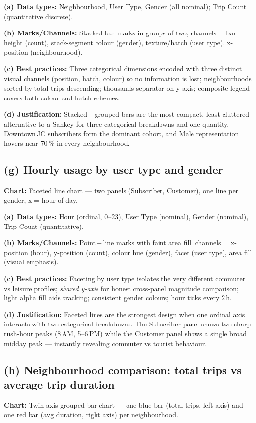 \documentclass[11pt, a4paper]{article}
\begin{document}
\textbf{(a) Data types:} Neighbourhood, User Type, Gender (all nominal); Trip Count (quantitative discrete).

\textbf{(b) Marks/Channels:} Stacked bar marks in groups of two; channels = bar height (count), stack-segment colour (gender), texture/hatch (user type), x-position (neighbourhood).

\textbf{(c) Best practices:} Three categorical dimensions encoded with three distinct visual channels (position, hatch, colour) so no information is lost; neighbourhoods sorted by total trips descending; thousands-separator on y-axis; composite legend covers both colour and hatch schemes.

\textbf{(d) Justification:} Stacked\,+\,grouped bars are the most compact, least-cluttered alternative to a Sankey for three categorical breakdowns and one quantity. Downtown\,JC subscribers form the dominant cohort, and Male representation hovers near 70\,\% in every neighbourhood.

\subsection{(g) Hourly usage by user type and gender}
\textbf{Chart:} Faceted line chart --- two panels (Subscriber, Customer), one line per gender, x = hour of day.

\textbf{(a) Data types:} Hour (ordinal, 0--23), User Type (nominal), Gender (nominal), Trip Count (quantitative).

\textbf{(b) Marks/Channels:} Point\,+\,line marks with faint area fill; channels = x-position (hour), y-position (count), colour hue (gender), facet (user type), area fill (visual emphasis).

\textbf{(c) Best practices:} Faceting by user type isolates the very different commuter vs leisure profiles; \emph{shared y-axis} for honest cross-panel magnitude comparison; light alpha fill aids tracking; consistent gender colours; hour ticks every 2\,h.

\textbf{(d) Justification:} Faceted lines are the strongest design when one ordinal axis interacts with two categorical breakdowns. The Subscriber panel shows two sharp rush-hour peaks (8\,AM, 5--6\,PM) while the Customer panel shows a single broad midday peak --- instantly revealing commuter vs tourist behaviour.

\subsection{(h) Neighbourhood comparison: total trips vs average trip duration}
\textbf{Chart:} Twin-axis grouped bar chart --- one blue bar (total trips, left axis) and one red bar (avg duration, right axis) per neighbourhood.
\end{document}
